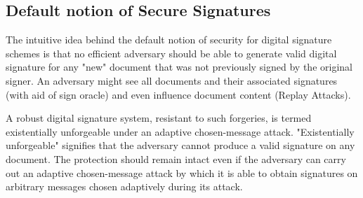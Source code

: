 \documentclass[]{final_report}
\theoremstyle{definition}
\begin{document}
\subsection{Default notion of Secure Signatures}
The intuitive idea behind the default notion of security for digital signature schemes is that no efficient adversary should be able to generate valid digital signature for any "new" document that was not previously signed by the original signer.
An adversary might see all documents and their associated signatures (with aid of sign oracle) and even influence document content (Replay Attacks).

A robust digital signature system, resistant to such forgeries, is termed existentially unforgeable under an adaptive chosen-message attack. "Existentially unforgeable" signifies that the adversary cannot produce a valid signature on any document. The protection should remain intact even if the adversary can carry out an adaptive chosen-message attack by which it is able to obtain signatures on arbitrary messages chosen adaptively during its attack.
\end{document}
